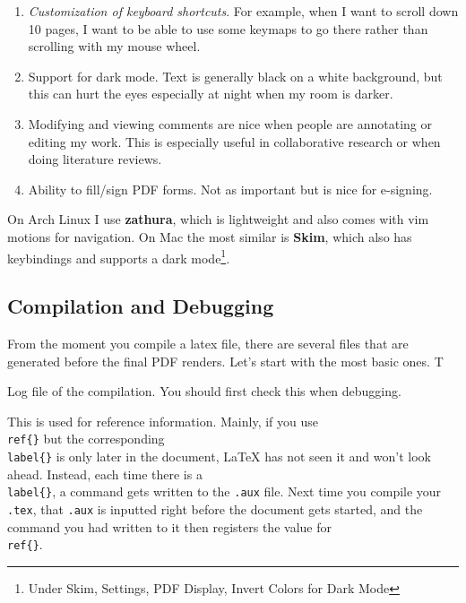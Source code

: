  \begin{enumerate}
    \item \textit{Customization of keyboard shortcuts}. For example, when I want to scroll down 10 pages, I want to be able to use some keymaps to go there rather than scrolling with my mouse wheel. 
    \item Support for dark mode. Text is generally black on a white background, but this can hurt the eyes especially at night when my room is darker. 
    \item Modifying and viewing comments are nice when people are annotating or editing my work. This is especially useful in collaborative research or when doing literature reviews. 
    \item Ability to fill/sign PDF forms. Not as important but is nice for e-signing. 
  \end{enumerate}
  
  On Arch Linux I use \textbf{zathura}, which is lightweight and also comes with vim motions for navigation. On Mac the most similar is \textbf{Skim}, which also has keybindings and supports a dark mode\footnote{Under Skim, Settings, PDF Display, Invert Colors for Dark Mode}. 

\subsection{Compilation and Debugging}

  From the moment you compile a latex file, there are several files that are generated before the final PDF renders. Let's start with the most basic ones. T

  \begin{definition}
    Log file of the compilation. You should first check this when debugging. 
  \end{definition}

  \begin{definition}
    This is used for reference information. Mainly, if you use \texttt{\\ref\{\}} but the corresponding \texttt{\\label\{\}} is only later in the document, LaTeX has not seen it and won't look ahead. Instead, each time there is a \texttt{\\label\{\}}, a command gets written to the \texttt{.aux} file. Next time you compile your \texttt{.tex}, that \texttt{.aux} is inputted right before the document gets started, and the command you had written to it then registers the value for \texttt{\\ref\{\}}. 
  \end{definition}

